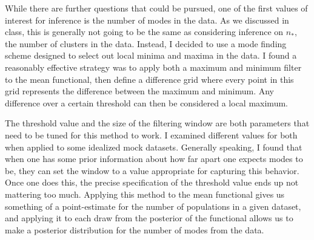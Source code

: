\documentclass{article}
\begin{document}
While there are further questions that could be pursued, one of the first values of interest for inference is the number of 
modes in the data. As we discussed in class, this is generally not going to be the same as considering inference on
$n_*$, the number of clusters in the data. Instead, I decided to use a mode finding scheme designed to select out
local minima and maxima in the data. I found a reasonably effective strategy was to apply both a maximum and minimum
filter to the mean functional, then define a difference grid where every point in this grid represents the difference between
the maximum and minimum. Any difference over a certain threshold can then be considered a local maximum.

The threshold value and the size of the filtering window are both parameters that need to be tuned for this method to work.
I examined different values for both when applied to some idealized mock datasets. Generally speaking, I found that
when one has some prior information about how far apart one expects modes to be, they can set the window to
a value appropriate for capturing this behavior. Once one does this, the precise specification of the threshold value
ends up not mattering too much. Applying this method to the mean functional gives us something of a point-estimate
for the number of populations in a given dataset, and applying it to each draw from the posterior of the functional
allows us to make a posterior distribution for the number of modes from the data.

\end{document}
